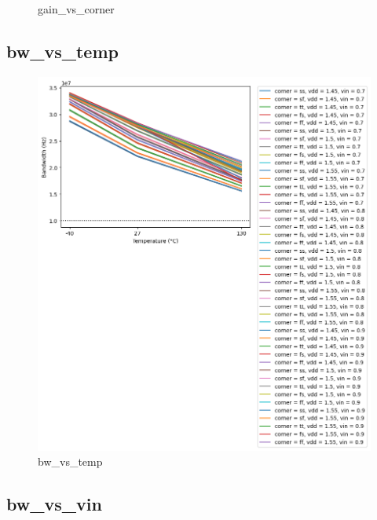 \documentclass[
  a4paper,
  DIV=11,
  numbers=noendperiod]{scrartcl}
\begin{document}
\begin{tcolorbox}
\begin{figure}[H]
{}

\caption{gain\_vs\_corner}

\end{figure}%

\subsection{bw\_vs\_temp}\label{bw_vs_temp}

\begin{figure}[H]

{\centering \includegraphics{./cace/_docs/ota-5t/schematic/bw_vs_temp.png}

}

\caption{bw\_vs\_temp}

\end{figure}%

\subsection{bw\_vs\_vin}\label{bw_vs_vin}

\begin{figure}[H]


\end{figure}
\end{tcolorbox}
\end{document}

